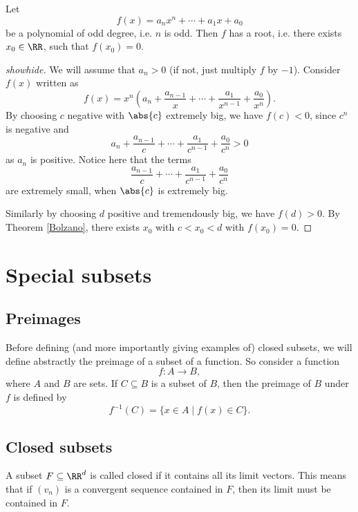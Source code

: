 \documentclass{article}
\begin{document}
\begin{proposition}
Let
$$
f(x) = a_n x^n + \cdots + a_1 x + a_0
$$
be a polynomial of odd degree, i.e. $n$ is odd. Then $f$ has a root,
i.e. there exists $x_0\in\RR$, such that $f(x_0) = 0$.
\end{proposition}
\begin{proof}[showhide]
We will assume that $a_n > 0$ (if not, just multiply $f$ by $-1$). Consider $f(x)$ written as
$$
f(x) = x^n \left(a_n + \frac{a_{n-1}}{x} + \cdots + \frac{a_1}{x^{n-1}} + \frac{a_0}{x^n}\right).
$$
By choosing $c$ negative with $\abs{c}$ extremely big, we have $f(c) < 0$, 
since $c^n$ is negative and 
$$
a_n + \frac{a_{n-1}}{c} + \cdots + \frac{a_1}{c^{n-1}} + \frac{a_0}{c^n} > 0
$$
as $a_n$ is positive. Notice here that the terms
$$
\frac{a_{n-1}}{c} + \cdots + \frac{a_1}{c^{n-1}} + \frac{a_0}{c^n} 
$$
are extremely small, when $\abs{c}$ is extremely big.

Similarly by choosing
$d$ positive and tremendously big, we have $f(d) > 0$.
By Theorem \ref{Bolzano}, there exists $x_0$ with $c < x_0 < d$ with
$f(x_0) = 0$.
\end{proof}



\section{Special subsets}



\subsection{Preimages}

Before defining (and more importantly giving examples of) closed subsets, we will
define abstractly the preimage of a subset of a function. So consider a
function
$$
f: A \rightarrow B,
$$
where $A$ and $B$ are sets. If $C\subseteq B$ is a subset of $B$, then the
preimage of $B$ under $f$ is defined by
$$
f^{-1}(C) = \{x\in A \mid f(x)\in C\}.
$$

\subsection{Closed subsets}

A subset $F\subseteq \RR^d$ is called closed if it contains all its limit vectors. This
means that if $(v_n)$ is a convergent sequence contained in $F$, then its limit must
be contained in $F$.
\end{document}
